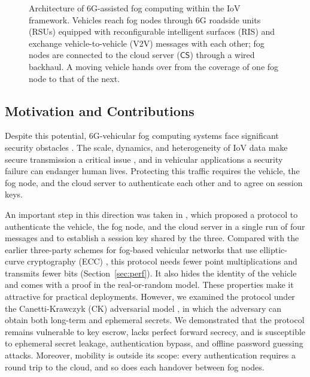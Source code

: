 \documentclass[journal]{IEEEtran}
\theoremstyle{plain}
\theoremstyle{definition}
\newcommand{\CS}{\mathsf{CS}}            %
\begin{document}
\begin{figure}[!t]
{}
\caption{Architecture of 6G-assisted fog computing within the IoV framework. Vehicles reach fog nodes through 6G roadside units (RSUs) equipped with reconfigurable intelligent surfaces (RIS) and exchange vehicle-to-vehicle (V2V) messages with each other; fog nodes are connected to the cloud server ($\CS$) through a wired backhaul. A moving vehicle hands over from the coverage of one fog node to that of the next.}
\label{fig:arch}
\end{figure}


\subsection{Motivation and Contributions}
Despite this potential, 6G-vehicular fog computing systems face significant security obstacles \cite{rahdari2025survey}. The scale, dynamics, and heterogeneity of IoV data make secure transmission a critical issue \cite{sutradhar2024survey}, and in vehicular applications a security failure can endanger human lives. Protecting this traffic requires the vehicle, the fog node, and the cloud server to authenticate each other and to agree on session keys.

An important step in this direction was taken in \cite{chen2024provably}, which proposed a protocol to authenticate the vehicle, the fog node, and the cloud server in a single run of four messages and to establish a session key shared by the three. Compared with the earlier three-party schemes for fog-based vehicular networks that use elliptic-curve cryptography (ECC) \cite{ma2019efficient,eftekhari2021security}, this protocol needs fewer point multiplications and transmits fewer bits (Section~\ref{sec:perf}). It also hides the identity of the vehicle and comes with a proof in the real-or-random model. These properties make it attractive for practical deployments. However, we examined the protocol under the Canetti-Krawczyk (CK) adversarial model \cite{canetti2001analysis}, in which the adversary can obtain both long-term and ephemeral secrets. We demonstrated that the protocol remains vulnerable to key escrow, lacks perfect forward secrecy, and is susceptible to ephemeral secret leakage, authentication bypass, and offline password guessing attacks. Moreover, mobility is outside its scope: every authentication requires a round trip to the cloud, and so does each handover between fog nodes.
\end{document}

